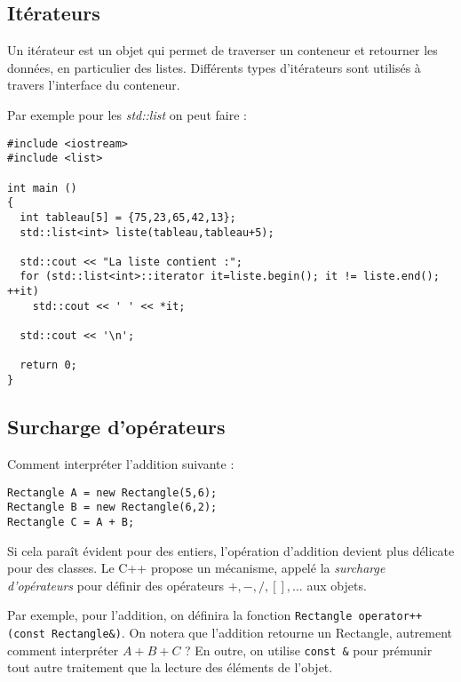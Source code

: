 \documentclass[abstracton]{scrartcl}
\begin{document}
\subsection{Itérateurs}

Un itérateur est un objet qui permet de traverser un conteneur et retourner les données, en particulier des listes. Différents types d'itérateurs sont utilisés à travers l'interface du conteneur.

Par exemple pour les \emph{std::list} on peut faire :

\begin{lstlisting}
#include <iostream>
#include <list>

int main ()
{
  int tableau[5] = {75,23,65,42,13};
  std::list<int> liste(tableau,tableau+5);

  std::cout << "La liste contient :";
  for (std::list<int>::iterator it=liste.begin(); it != liste.end(); ++it)
    std::cout << ' ' << *it;

  std::cout << '\n';

  return 0;
}
\end{lstlisting}



\subsection{Surcharge d'opérateurs}

Comment interpréter l'addition suivante :
\begin{lstlisting}
Rectangle A = new Rectangle(5,6);
Rectangle B = new Rectangle(6,2);
Rectangle C = A + B;
\end{lstlisting}

Si cela paraît évident pour des entiers, l'opération d'addition devient plus délicate pour des classes. Le C++ propose un mécanisme, appelé la \emph{surcharge d'opérateurs} pour définir des opérateurs $+, -, /, [], ...$ aux objets.

Par exemple, pour l'addition, on définira la fonction \lstinline{Rectangle operator++(const Rectangle&)}. On notera que l'addition retourne un Rectangle, autrement comment interpréter $A + B + C$ ? En outre, on utilise \lstinline{const &} pour prémunir tout autre traitement que la lecture des éléments de l'objet.
\end{document}
